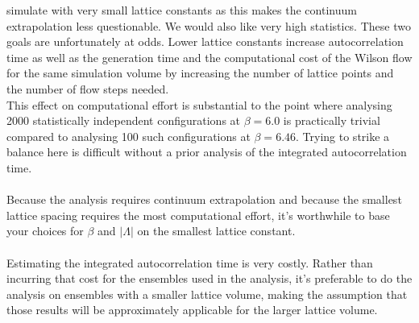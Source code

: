 \documentclass[a4paper,10pt]{book}
\begin{document}
simulate with very small lattice constants as this makes the continuum extrapolation less questionable. We would also like very high statistics. These two goals are unfortunately at odds. Lower lattice constants increase autocorrelation time as well as the generation time and the computational cost of the Wilson flow for the same simulation volume by increasing the number of lattice points and the number of flow steps needed.\\This effect on computational effort is substantial to the point where analysing 2000 statistically independent configurations at $\beta=6.0$ is practically trivial compared to analysing 100 such configurations at $\beta=6.46$. Trying to strike a balance here is difficult without a prior analysis of the integrated autocorrelation time.\\\\Because the analysis requires continuum extrapolation and because the smallest lattice spacing requires the most computational effort, it's worthwhile to base your choices for $\beta$ and $|\Lambda|$ on the smallest lattice constant.\\\\Estimating the integrated autocorrelation time is very costly. Rather than incurring that cost for the ensembles used in the analysis, it's preferable to do the analysis on ensembles with a smaller lattice volume, making the assumption that those results will be approximately applicable for the larger lattice volume. 
\end{document}
